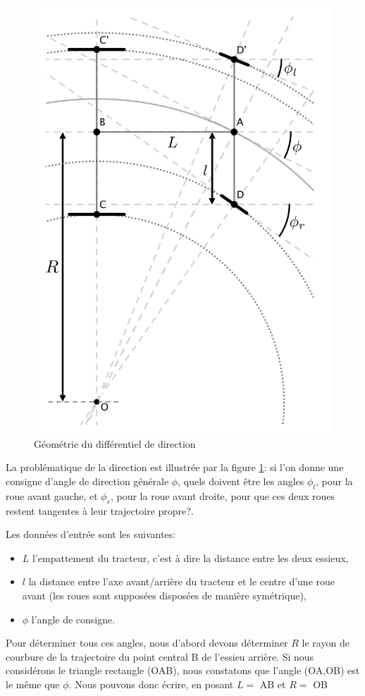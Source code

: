 \documentclass[12pt,a4paper]{report}
\begin{document}
			\begin{figure}[!]
				\centering
				\includegraphics[width=0.7\linewidth]{img/ackermann}
				\caption[Géométrie Différentiel]{Géométrie du différentiel de direction}
				\label{fig:ackermann}
			\end{figure}
		
			\para La problématique de la direction est illustrée par la figure \ref{fig:ackermann}: si l'on donne une consigne d'angle de direction générale $\phi$, quels doivent être les angles $\phi_l$, pour la roue avant gauche, et $\phi_r$, pour la roue avant droite, pour que ces deux roues restent tangentes à leur trajectoire propre?.
			
			\para Les données d'entrée sont les suivantes:
			\begin{itemize}
				\item $L$ l'empattement du tracteur, c'est à dire la distance entre les deux essieux,
				\item $l$ la distance entre l'axe avant/arrière du tracteur et le centre d'une roue avant (les roues sont supposées disposées de manière symétrique),
				\item $\phi$ l'angle de consigne.
			\end{itemize}
		
			\para Pour déterminer tous ces angles, nous d'abord devons déterminer $R$ le rayon de courbure de la trajectoire du point central B de l'essieu arrière. Si nous considérons le triangle rectangle (OAB), nous constatons que l'angle (OA,OB) est le même que $\phi$. Nous pouvons donc écrire, en posant $L=$ AB et $R=$ OB 
			
\end{document}
